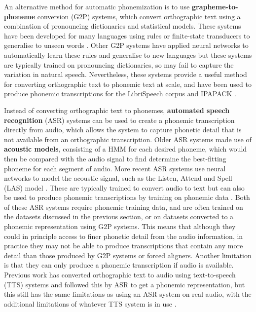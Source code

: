An alternative method for automatic phonemization is to use \textbf{grapheme-to-phoneme} conversion (G2P) systems, which convert orthographic text using a combination of pronouncing dictionaries and statistical models. These systems have been developed for many languages using rules or finite-state transducers to generalise to unseen words \citep{Mortensen-et-al:2018, johnson2020g2p, hasegawa-2020-g2pmultilingual, Bernard2021}. Other G2P systems have applied neural networks to automatically learn these rules and generalise to new languages \citep{NOVAK_MINEMATSU_HIROSE_2016, Zhu2022} but these systems are typically trained on pronouncing dictionaries, so may fail to capture the variation in natural speech. Nevertheless, these systems provide a useful method for converting orthographic text to phonemic text at scale, and have been used to produce phonemic transcriptions for the LibriSpeech corpus \citep{Kahn_2020} and IPAPACK \citep{zhu-etal-2024-taste}.

Instead of converting orthographic text to phonemes, \textbf{automated speech recognition} (ASR) systems can be used to create a phonemic transcription directly from audio, which allows the system to capture phonetic detail that is not available from an orthographic transcription. Older ASR systems made use of \textbf{acoustic models}, consisting of a HMM for each desired phoneme, which would then be compared with the audio signal to find determine the best-fitting phoneme for each segment of audio. More recent ASR systems use neural networks to model the acoustic signal, such as the Listen, Attend and Spell (LAS) model \citep{chan2015listen}. These are typically trained to convert audio to text but can also be used to produce phonemic transcriptions by training on phonemic data \citep{feng-2023-language-universal-phonetic}. Both of these ASR systems require phonemic training data, and are often trained on the datasets discussed in the previous section, or on datasets converted to a phonemic representation using G2P systems. This means that although they could in principle access to finer phonetic detail from the audio information, in practice they may not be able to produce transcriptions that contain any more detail than those produced by G2P systems or forced aligners. Another limitation is that they can only produce a phonemic transcription if audio is available. Previous work has converted orthographic text to audio using text-to-speech (TTS) systems and followed this by ASR to get a phonemic representation, but this still has the same limitations as using an ASR system on real audio, with the additional limitations of whatever TTS system is in use .  


